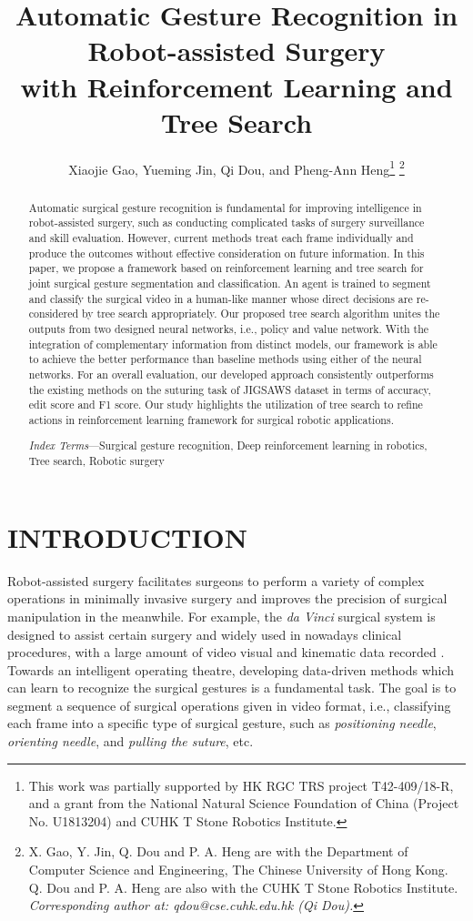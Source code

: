 \documentclass[letterpaper, 10 pt, conference]{ieeeconf}
\title{\LARGE \bf
	Automatic Gesture Recognition in Robot-assisted Surgery\\ with Reinforcement Learning and Tree Search 
}
\author{Xiaojie Gao, Yueming Jin, Qi Dou, and Pheng-Ann Heng\thanks{This work was partially supported by HK RGC TRS project T42-409/18-R, and a grant from the National Natural Science Foundation of China (Project No. U1813204) and CUHK T Stone Robotics Institute.}
	\thanks{X. Gao, Y. Jin, Q. Dou and P. A. Heng are with the Department of Computer Science and Engineering, The Chinese University of Hong Kong. Q. Dou and P. A. Heng are also with the CUHK T Stone Robotics Institute. \emph{Corresponding author at: qdou@cse.cuhk.edu.hk (Qi Dou).}}
}
\begin{document}
	
	
	
\maketitle
\thispagestyle{empty}
\pagestyle{empty}
	
	

\begin{abstract}
Automatic surgical gesture recognition is fundamental for improving intelligence in robot-assisted surgery, such as conducting complicated tasks of surgery surveillance and skill evaluation. However, current methods treat each frame individually and produce the outcomes without effective consideration on future information. In this paper, we propose a framework based on reinforcement learning and tree search for joint surgical gesture segmentation and classification. An agent is trained to segment and classify the surgical video in a human-like manner whose direct decisions are re-considered by tree search appropriately. Our proposed tree search algorithm unites the outputs from two designed neural networks, i.e., policy and value network. With the integration of complementary information from distinct models, our framework is able to achieve the better performance than baseline methods using either of the neural networks. For an overall evaluation, our developed approach consistently outperforms the existing methods on the suturing task of JIGSAWS dataset in terms of accuracy, edit score and F1 score. Our study highlights the utilization of tree search to refine actions in reinforcement learning framework for surgical robotic applications.

\textit{Index Terms}---Surgical gesture recognition, Deep reinforcement learning in robotics, Tree search, Robotic surgery
\end{abstract}
	
	
\section{INTRODUCTION}

Robot-assisted surgery facilitates surgeons to perform a variety of complex operations in minimally invasive surgery and improves the precision of surgical manipulation in the meanwhile. For example, the \textit{da Vinci} surgical system is designed to assist certain surgery and widely used in 
nowadays clinical procedures, with a large amount of video visual and kinematic data recorded \cite{van2019weakly}.
Towards an intelligent operating theatre, developing data-driven methods which can learn to recognize the surgical gestures is a fundamental task. The goal is to segment a sequence of surgical operations given in video format, 
i.e., classifying each frame into a specific type of surgical gesture, such as \textit{positioning needle}, \textit{orienting needle}, and \textit{pulling the suture}, etc. 
\end{document}
